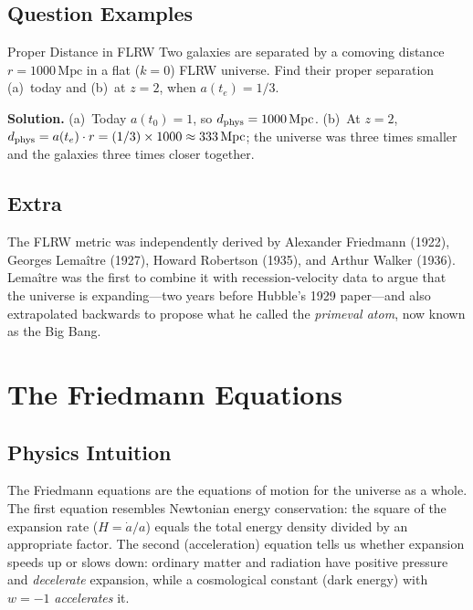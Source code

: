\subsection{Question Examples}

\begin{example}{Proper Distance in FLRW}{}
Two galaxies are separated by a comoving distance $r = 1000\,\mathrm{Mpc}$
in a flat ($k=0$) FLRW universe.
Find their proper separation (a)~today and (b)~at $z=2$, when $a(t_e)=1/3$.

\medskip\textbf{Solution.}\quad
(a)~Today $a(t_0)=1$, so $d_{\rm phys} = 1000\,\mathrm{Mpc}$.
(b)~At $z=2$, $d_{\rm phys} = a(t_e)\cdot r = (1/3)\times1000 \approx 333\,\mathrm{Mpc}$;
the universe was three times smaller and the galaxies three times closer together.
\end{example}

\subsection{Extra}

\begin{extra}
The FLRW metric was independently derived by Alexander Friedmann (1922),
Georges Lema\^itre (1927), Howard Robertson (1935), and Arthur Walker (1936).
Lema\^itre was the first to combine it with recession-velocity data to argue
that the universe is expanding—two years before Hubble's 1929 paper—and
also extrapolated backwards to propose what he called the \emph{primeval atom},
now known as the Big Bang.
\end{extra}

\section{The Friedmann Equations}

\subsection{Physics Intuition}

\begin{intuition}
The Friedmann equations are the equations of motion for the universe as a whole.
The first equation resembles Newtonian energy conservation: the square of the expansion
rate ($H = \dot a/a$) equals the total energy density divided by an appropriate factor.
The second (acceleration) equation tells us whether expansion speeds up or slows down:
ordinary matter and radiation have positive pressure and \emph{decelerate} expansion,
while a cosmological constant (dark energy) with $w=-1$ \emph{accelerates} it.
\end{intuition}

